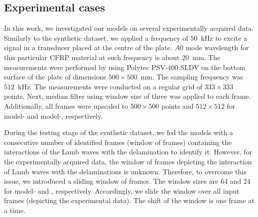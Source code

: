 \subsection{Experimental cases}
In this work, we investigated our models on several experimentally acquired data.
Similarly to the synthetic dataset, we applied a frequency of \(50\)~kHz to excite a signal in a transducer placed at the centre of the plate. 
\(A0\) mode wavelength for this particular CFRP material at such frequency is about \(20\)~mm. 
The measurements were performed by using Polytec PSV-\(400\) SLDV on the bottom surface of the plate of dimensions \(500\times500\)~mm. 
The sampling frequency was \(512\)~kHz. 
The measurements were conducted on a regular grid of \(333\times333\) points. 
Next, median filter using window size of three was applied to each frame. Additionally, all frames were upscaled to \(500\times500\) points and \(512\times512\) for model- and model-, respectively.

During the testing stage of the synthetic dataset,  we fed the models with a consecutive number of identified frames (window of frames) containing the interactions of the Lamb waves with the delamination to identify it.
However, for the experimentally acquired data, the window of frames depicting the interaction of Lamb waves with the delaminations is unknown.
Therefore, to overcome this issue, we introduced a sliding window of frames. 
The window sizes are \(64\) and \(24\) for model- and , respectively.
Accordingly, we slide the window over all input frames (depicting the experimental data).
The shift of the window is one frame at a time.

